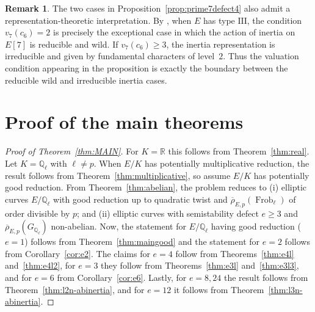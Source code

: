 \documentclass[12pt]{amsart}
\numberwithin{equation}{section}
\theoremstyle{definition}
\newtheorem{remark}[equation]{Remark}
\newcommand{\Q}{\mathbb{Q}}
\newcommand{\R}{\mathbb{R}}
\newcommand{\rhobar}{{\overline{\rho}}}
\DeclareMathOperator{\Frob}{Frob}
\begin{document}
\begin{remark}
The two cases in Proposition~\ref{prop:prime7defect4} also admit a
representation-theoretic interpretation. By
\cite[Proposition~2, Lemme~2 and Proposition~4]{Kraus1997}, when
$E$ has type $\mathrm{III}$, the condition $v_7(c_6)=2$ is precisely
the exceptional case in which the action of inertia on $E[7]$ is
reducible and wild. If $v_7(c_6)\geq3$, the inertia representation is
irreducible and given by fundamental characters of level~$2$. Thus the valuation condition appearing in
the proposition is exactly the boundary between the reducible wild
and irreducible inertia cases.
\end{remark}
 
\section{Proof of the main theorems}

\begin{proof}[Proof of Theorem~\ref{thm:MAIN}]
For $K=\R$ this follows from Theorem~\ref{thm:real}. 
Let $K = \Q_\ell$ with $\ell \neq p$.
When $E/K$ has potentially multiplicative reduction, the result follows from Theorem~\ref{thm:multiplicative}, so assume $E/K$ has potentially good reduction. 
From Theorem~\ref{thm:abelian}, the problem reduces to (i) elliptic curves $E/\Q_\ell$ with good reduction up to quadratic twist and $\rhobar_{E,p}(\Frob_\ell)$ of order divisible by $p$; and (ii) elliptic curves with semistability defect $e \geq 3$ and $\rhobar_{E,p}(G_{\Q_\ell})$ non-abelian.
Now, the statement for $E/\Q_\ell$ having good reduction ($e=1$) follows from Theorem~\ref{thm:maingood}  and the statement for $e=2$ follows from Corollary~\ref{cor:e2}. The claims for $e=4$ follow from Theorems~\ref{thm:e4l} and~\ref{thm:e4l2}, for $e=3$ they follow from Theorems~\ref{thm:e3l} and~\ref{thm:e3l3}, and for 
$e=6$ from Corollary~\ref{cor:e6}. Lastly, for $e = 8, 24$ the result follows from Theorem~\ref{thm:l2n-abinertia}, and for $e=12$ it follows from Theorem~\ref{thm:l3n-abinertia}. 
\end{proof}
 
\end{document}
